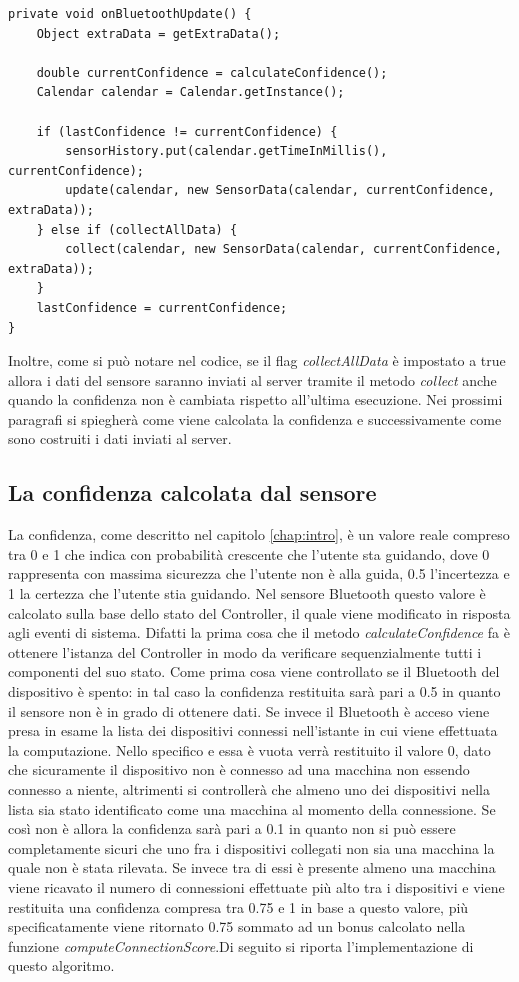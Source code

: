 \begin{verbatim}
private void onBluetoothUpdate() {
    Object extraData = getExtraData();

    double currentConfidence = calculateConfidence();
    Calendar calendar = Calendar.getInstance();

    if (lastConfidence != currentConfidence) {
        sensorHistory.put(calendar.getTimeInMillis(), currentConfidence);
        update(calendar, new SensorData(calendar, currentConfidence, extraData));
    } else if (collectAllData) {
        collect(calendar, new SensorData(calendar, currentConfidence, extraData));
    }
    lastConfidence = currentConfidence;
}
\end{verbatim}
Inoltre, come si può notare nel codice, se il flag \textit{collectAllData} è impostato a true allora i dati del sensore saranno inviati al server tramite il metodo \textit{collect} anche quando la confidenza non è cambiata rispetto all'ultima esecuzione. Nei prossimi paragrafi si spiegherà come viene calcolata la confidenza e successivamente come sono costruiti i dati inviati al server.

\subsection{La confidenza calcolata dal sensore}
La confidenza, come descritto nel capitolo \ref{chap:intro}, è un valore reale compreso tra 0 e 1 che indica con probabilità crescente che l'utente sta guidando, dove 0 rappresenta con massima sicurezza che l'utente non è alla guida, 0.5 l'incertezza e 1 la certezza che l'utente stia guidando. Nel sensore Bluetooth questo valore è calcolato sulla base dello stato del Controller, il quale viene modificato in risposta agli eventi di sistema. Difatti la prima cosa che il metodo \textit{calculateConfidence} fa è ottenere l'istanza del Controller in modo da verificare sequenzialmente tutti i componenti del suo stato. Come prima cosa viene controllato se il Bluetooth del dispositivo è spento: in tal caso la confidenza restituita sarà pari a 0.5 in quanto il sensore non è in grado di ottenere dati. Se invece il Bluetooth è acceso viene presa in esame la lista dei dispositivi connessi nell'istante in cui viene effettuata la computazione. Nello specifico e essa è vuota verrà restituito il valore 0, dato che sicuramente il dispositivo non è connesso ad una macchina non essendo connesso a niente, altrimenti si controllerà che almeno uno dei dispositivi nella lista sia stato identificato come una macchina al momento della connessione. Se così non è allora la confidenza sarà pari a 0.1 in quanto non si può essere completamente sicuri che uno fra i dispositivi collegati non sia una macchina la quale non è stata rilevata. Se invece tra di essi è presente almeno una macchina viene ricavato il numero di connessioni effettuate più alto tra i dispositivi e viene restituita una confidenza compresa tra 0.75 e 1 in base a questo valore, più specificatamente viene ritornato 0.75 sommato ad un bonus calcolato nella funzione \textit{computeConnectionScore}.Di seguito si riporta l'implementazione di questo algoritmo.

